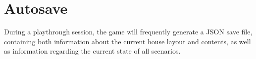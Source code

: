 \section{Autosave}
During a playthrough session, the game will frequently generate a JSON save file, containing both information about the current house layout and contents, as well as information regarding the current state of all scenarios.